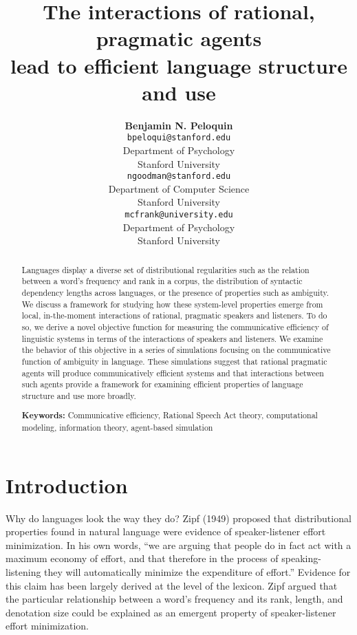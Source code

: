 \documentclass[10pt, letterpaper]{article}
\title{The interactions of rational, pragmatic agents\\
lead to efficient language structure and use}
\author{{\large \bf Benjamin N. Peloquin} \\ \texttt{bpeloqui@stanford.edu} \\ Department of Psychology \\ Stanford University \And {\large \bf Noah D. Goodman} \\ \texttt{ngoodman@stanford.edu} \\ Department of Computer Science \\ Stanford University \And {\large \bf Michael C. Frank} \\ \texttt{mcfrank@university.edu} \\ Department of Psychology \\ Stanford University}
\begin{document}
\maketitle

\begin{abstract}
Languages display a diverse set of distributional regularities such as
the relation between a word's frequency and rank in a corpus, the
distribution of syntactic dependency lengths across languages, or the
presence of properties such as ambiguity. We discuss a framework for
studying how these system-level properties emerge from local,
in-the-moment interactions of rational, pragmatic speakers and
listeners. To do so, we derive a novel objective function for measuring
the communicative efficiency of linguistic systems in terms of the
interactions of speakers and listeners. We examine the behavior of this
objective in a series of simulations focusing on the communicative
function of ambiguity in language. These simulations suggest that
rational pragmatic agents will produce communicatively efficient systems
and that interactions between such agents provide a framework for
examining efficient properties of language structure and use more
broadly.

\textbf{Keywords:}
Communicative efficiency, Rational Speech Act theory, computational
modeling, information theory, agent-based simulation
\end{abstract}

\section{Introduction}\label{introduction}

Why do languages look the way they do? Zipf (1949) proposed that
distributional properties found in natural language were evidence of
speaker-listener effort minimization. In his own words, ``we are arguing
that people do in fact act with a maximum economy of effort, and that
therefore in the process of speaking-listening they will automatically
minimize the expenditure of effort.'' Evidence for this claim has been
largely derived at the level of the lexicon. Zipf argued that the
particular relationship between a word's frequency and its rank, length,
and denotation size could be explained as an emergent property of
speaker-listener effort minimization. \par
\end{document}
